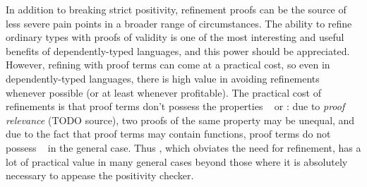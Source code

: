 In addition to breaking strict positivity, refinement proofs can be the source of less severe pain points in
a broader range of circumstances.
The ability to refine ordinary types with proofs of validity is one of the most interesting and useful benefits of
dependently-typed languages, and this power should be appreciated. However, refining with proof terms can
come at a practical cost, so even in dependently-typed languages, there is high value in avoiding refinements
whenever possible (or at least whenever profitable). The practical cost of refinements is that proof terms
don't possess the properties \SemInj~ or \EqDec: due to \emph{proof relevance} (TODO source), two proofs of
the same property may be unequal, and due to the fact that proof terms may contain functions, proof terms do not
possess \EqDec~ in the general case. Thus \SemTot, which obviates the need for refinement, has
a lot of practical value in many general cases beyond those where it is absolutely necessary to appease the
positivity checker.
